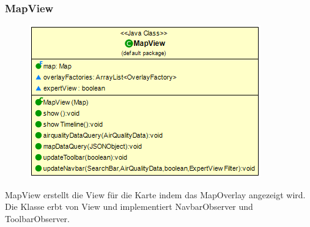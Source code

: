 \subsubsection{MapView}
\begin{minipage}{0.3\textwidth}
    \begin{figure}[H]
        \includegraphics[scale = 0.5
        ]{media/view/view/MapView_Class.png}
    \end{figure}
    \end{minipage} \hfill
    \begin{minipage}{0.6\textwidth}
MapView erstellt die View für die Karte indem das MapOverlay angezeigt wird. Die Klasse erbt von View und implementiert NavbarObserver und ToolbarObserver.
\end{minipage}
